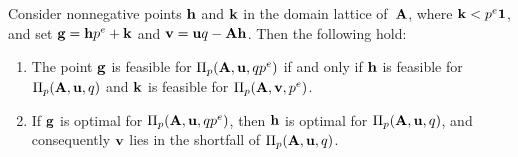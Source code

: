 \documentclass{article}
\begin{document}


\begin{lemma}
   \label{general AIP prep: L}
   Consider nonnegative points $\mathbf{h}$ and $\mathbf{k}$ in the domain lattice of~$\mathbf{A}$, where $\mathbf{k} < p^e \mathbf{1}$, and set $\mathbf{g} = \mathbf{h} p^e + \mathbf{k}$ and $\mathbf{v} = \mathbf{u}q - \mathbf{A}\mathbf{h}$.
   Then the following hold\textup:
   \begin{enumerate}[$(1)$]
      \item The point $\mathbf{g}$ is feasible for $\Pi_p(\mathbf{A},\mathbf{u},qp^e)$ if and only if $\mathbf{h}$ is feasible for $\Pi_p(\mathbf{A},\mathbf{u},q)$ and $\mathbf{k}$ is feasible for  $\Pi_p(\mathbf{A},\mathbf{v},p^e)$.
      \item If $\mathbf{g}$ is optimal for $\Pi_p(\mathbf{A},\mathbf{u},qp^e)$, then $\mathbf{h}$ is optimal for $\Pi_p(\mathbf{A},\mathbf{u},q)$, and consequently $\mathbf{v}$ lies in the shortfall of  $\Pi_p(\mathbf{A},\mathbf{u},q)$.
   \end{enumerate}
\end{lemma}
\end{document}
